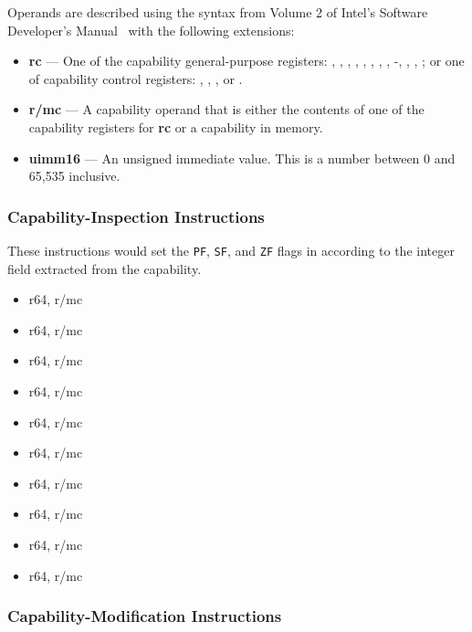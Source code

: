 Operands are described using the syntax from Volume 2 of Intel's
Software Developer's Manual~\cite{intel-sdm-vol2} with the following
extensions:

\begin{itemize}
  \item \textbf{rc} { }---{ } One of the capability general-purpose
    registers: \CAX{}, \CBX{}, \CCX{}, \CDX{}, \CDI{}, \CSI{}, \CBP{},
    \CSP{}, -, \DDC{}, \CFS{}, \CGS{}; or one of
    capability control registers: \KCC{}, \KSC{}, \CSTAR{}, or \KGS{}.

  \item \textbf{r/mc} { }---{ } A capability operand that is either
    the contents of one of the capability registers for \textbf{rc} or
    a capability in memory.

   \item \textbf{uimm16} { }---{ } An unsigned immediate value.  This
     is a number between 0 and 65,535 inclusive.
\end{itemize}

\subsubsection{Capability-Inspection Instructions}

These instructions would set the \texttt{PF}, \texttt{SF}, and
\texttt{ZF} flags in \RFLAGS{} according to the integer field
extracted from the capability.

\begin{itemize}
  \item {} r64, r/mc
  \item {} r64, r/mc
  \item {} r64, r/mc
  \item {} r64, r/mc
  \item {} r64, r/mc
  \item {} r64, r/mc
  \item {} r64, r/mc
  \item {} r64, r/mc
  \item {} r64, r/mc
  \item {} r64, r/mc
\end{itemize}

\subsubsection{Capability-Modification Instructions}

